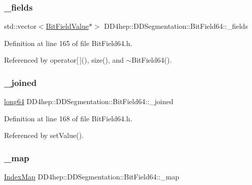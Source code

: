 \subsubsection{\texorpdfstring{\+\_\+fields}{\_fields}}
{\footnotesize\ttfamily std\+::vector$<$\hyperlink{class_d_d4hep_1_1_d_d_segmentation_1_1_bit_field_value}{Bit\+Field\+Value}$\ast$$>$ D\+D4hep\+::\+D\+D\+Segmentation\+::\+Bit\+Field64\+::\+\_\+fields\hspace{0.3cm}{\ttfamily [protected]}}



Definition at line 165 of file Bit\+Field64.\+h.



Referenced by operator\mbox{[}$\,$\mbox{]}(), size(), and $\sim$\+Bit\+Field64().

\hypertarget{class_d_d4hep_1_1_d_d_segmentation_1_1_bit_field64_afbef9d9ffa1944254144159c518fc227}{}\label{class_d_d4hep_1_1_d_d_segmentation_1_1_bit_field64_afbef9d9ffa1944254144159c518fc227} 
\subsubsection{\texorpdfstring{\+\_\+joined}{\_joined}}
{\footnotesize\ttfamily \hyperlink{namespace_d_d4hep_ac2a70e722b33dc7ddaa20db8954ac836}{long64} D\+D4hep\+::\+D\+D\+Segmentation\+::\+Bit\+Field64\+::\+\_\+joined\hspace{0.3cm}{\ttfamily [protected]}}



Definition at line 168 of file Bit\+Field64.\+h.



Referenced by set\+Value().

\hypertarget{class_d_d4hep_1_1_d_d_segmentation_1_1_bit_field64_a0bf8be0d75f49e529d583f4025a6b23c}{}\label{class_d_d4hep_1_1_d_d_segmentation_1_1_bit_field64_a0bf8be0d75f49e529d583f4025a6b23c} 
\subsubsection{\texorpdfstring{\+\_\+map}{\_map}}
{\footnotesize\ttfamily \hyperlink{class_d_d4hep_1_1_d_d_segmentation_1_1_bit_field64_a332cc613098802352470f92c7a7c71fd}{Index\+Map} D\+D4hep\+::\+D\+D\+Segmentation\+::\+Bit\+Field64\+::\+\_\+map\hspace{0.3cm}{\ttfamily [protected]}}



